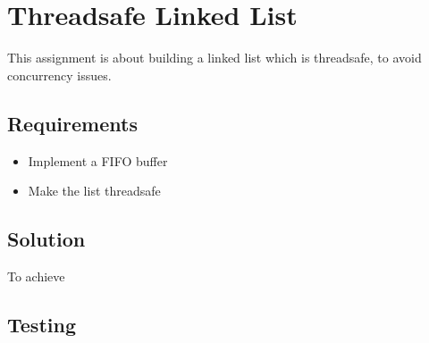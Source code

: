 \chapter{Threadsafe Linked List}
This assignment is about building a linked list which is threadsafe, to avoid concurrency issues.

\section{Requirements}
\begin{itemize}
\item Implement a FIFO buffer
\item Make the list threadsafe
\end{itemize}

\section{Solution}
To achieve 

\section{Testing}
